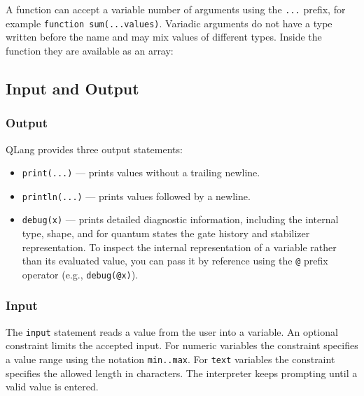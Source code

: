 A function can accept a variable number of arguments using the \texttt{...}
prefix, for example \texttt{function sum(...values)}. Variadic arguments do
not have a type written before the name and may mix values of different
types. Inside the function they are available as an array:




\subsection{Input and Output}\label{sec:io}

\subsubsection{Output}

QLang provides three output statements:

\begin{itemize}
    \item \texttt{print(...)} — prints values without a trailing newline.
    \item \texttt{println(...)} — prints values followed by a newline.
    \item \texttt{debug(x)} — prints detailed diagnostic information,
    including the internal type, shape, and for quantum states the gate
    history and stabilizer representation. To inspect the internal representation
    of a variable rather than its evaluated value, you can pass it by reference
    using the \texttt{@} prefix operator (e.g., \texttt{debug(@x)}).
\end{itemize}



\subsubsection{Input}

The \texttt{input} statement reads a value from the user into a variable.
An optional constraint limits the accepted input. For numeric variables
the constraint specifies a value range using the notation \texttt{min..max}.
For \texttt{text} variables the constraint specifies the allowed length in
characters. The interpreter keeps prompting until a valid value is entered.


